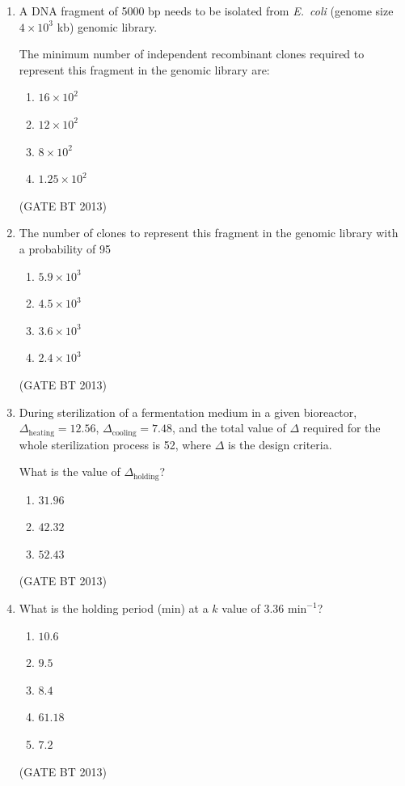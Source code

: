 \documentclass[journal,12pt,onecolumn]{IEEEtran}
\theoremstyle{remark}
\begin{document}
\begin{enumerate}
\item 
A DNA fragment of 5000 bp needs to be isolated from \textit{E.~coli} (genome size \(4 \times 10^{3}\) kb) genomic library.

    The minimum number of independent recombinant clones required to represent this fragment in the genomic library are:

\begin{enumerate}
    \item \(16 \times 10^{2}\)
    \item \(12 \times 10^{2}\)
    \item \(8 \times 10^{2}\)
    \item \(1.25 \times 10^{2}\)
\end{enumerate} \hfill(GATE BT 2013)

\item 

The number of clones to represent this fragment in the genomic library with a probability of 95%

\begin{enumerate}
    \item \(5.9 \times 10^{3}\)
    \item \(4.5 \times 10^{3}\)
    \item \(3.6 \times 10^{3}\)
    \item \(2.4 \times 10^{3}\)
\end{enumerate} \hfill(GATE BT 2013)

\item 

During sterilization of a fermentation medium in a given bioreactor, \(\Delta_{\text{heating}} = 12.56\), \(\Delta_{\text{cooling}} = 7.48\), and the total value of \(\Delta\) required for the whole sterilization process is 52, where \(\Delta\) is the design criteria.

What is the value of \(\Delta_{\text{holding}}\)?

\begin{enumerate}
    \item $31.96$
    \item $42.32$
    \item $52.43$
\end{enumerate} \hfill(GATE BT 2013)

\item 

What is the holding period (min) at a \(k\) value of \(3.36 \text{ min}^{-1}\)?

\begin{enumerate}
    \item $10.6$
    \item $9.5$
    \item $8.4$
    \item $61.18$
    \item $7.2$
\end{enumerate} \hfill(GATE BT 2013)


\end{enumerate}
\end{document}
